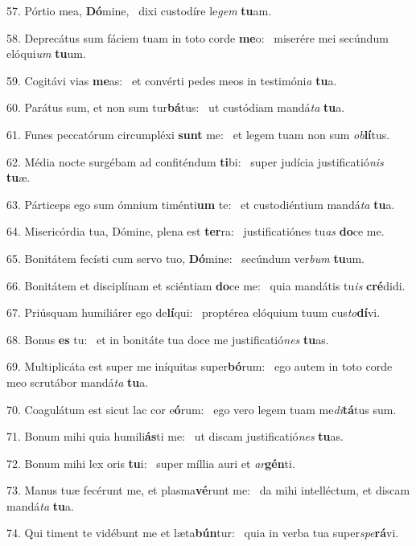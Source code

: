 57. Pórtio mea, \textbf{Dó}mine, \ast\  dixi custodíre le\textit{gem} \textbf{tu}am.\

58. Deprecátus sum fáciem tuam in toto corde \textbf{me}o: \ast\  miserére mei secúndum elóqui\textit{um} \textbf{tu}um.\

59. Cogitávi vias \textbf{me}as: \ast\  et convérti pedes meos in testimóni\textit{a} \textbf{tu}a.\

60. Parátus sum, et non sum tur\textbf{bá}tus: \ast\  ut custódiam mandá\textit{ta} \textbf{tu}a.\

61. Funes peccatórum circumpléxi \textbf{sunt} me: \ast\  et legem tuam non sum \textit{ob}\textbf{lí}tus.\

62. Média nocte surgébam ad confiténdum \textbf{ti}bi: \ast\  super judícia justificatió\textit{nis} \textbf{tu}æ.\

63. Párticeps ego sum ómnium timénti\textbf{um} te: \ast\  et custodiéntium mandá\textit{ta} \textbf{tu}a.\

64. Misericórdia tua, Dómine, plena est \textbf{ter}ra: \ast\  justificatiónes tu\textit{as} \textbf{do}ce me.\

65. Bonitátem fecísti cum servo tuo, \textbf{Dó}mine: \ast\  secúndum ver\textit{bum} \textbf{tu}um.\

66. Bonitátem et disciplínam et sciéntiam \textbf{do}ce me: \ast\  quia mandátis tu\textit{is} \textbf{cré}didi.\

67. Priúsquam humiliárer ego de\textbf{lí}qui: \ast\  proptérea elóquium tuum cus\textit{to}\textbf{dí}vi.\

68. Bonus \textbf{es} tu: \ast\  et in bonitáte tua doce me justificatió\textit{nes} \textbf{tu}as.\

69. Multiplicáta est super me iníquitas super\textbf{bó}rum: \ast\  ego autem in toto corde meo scrutábor mandá\textit{ta} \textbf{tu}a.\

70. Coagulátum est sicut lac cor e\textbf{ó}rum: \ast\  ego vero legem tuam me\textit{di}\textbf{tá}tus sum.\

71. Bonum mihi quia humili\textbf{ás}ti me: \ast\  ut discam justificatió\textit{nes} \textbf{tu}as.\

72. Bonum mihi lex oris \textbf{tu}i: \ast\  super míllia auri et \textit{ar}\textbf{gén}ti.\

73. Manus tuæ fecérunt me, et plasma\textbf{vé}runt me: \ast\  da mihi intelléctum, et discam mandá\textit{ta} \textbf{tu}a.\

74. Qui timent te vidébunt me et læta\textbf{bún}tur: \ast\  quia in verba tua super\textit{spe}\textbf{rá}vi.\

